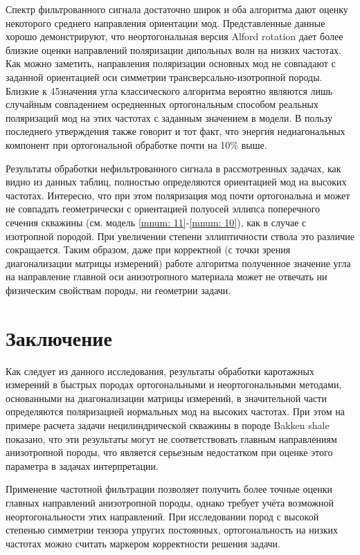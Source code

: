 \documentclass[a4paper,11pt]{article}
\begin{document}
Спектр фильтрованного сигнала достаточно широк и оба алгоритма дают оценку некоторого среднего направления ориентации мод. Представленные данные хорошо демонстрируют, что неортогональная версия Alford rotation дает более близкие оценки направлений поляризации дипольных волн на низких частотах. Как можно заметить, направления поляризации основных мод не совпадают с заданной ориентацией оси симметрии трансверсально-изотропной породы. Близкие к 45\textdegree значения угла классического алгоритма вероятно являются лишь случайным совпадением осредненных ортогональным способом реальных поляризаций мод на этих частотах с заданным значением в модели. В пользу последнего утверждения также говорит и тот факт, что энергия недиагональных компонент при ортогональной обработке почти на 10\% выше. 

Результаты обработки нефильтрованного сигнала в рассмотренных задачах, как видно из данных таблиц, полностью определяются ориентацией мод на высоких частотах. Интересно, что при этом поляризация мод почти ортогональна и может не совпадать геометрически с ориентацией полуосей эллипса поперечного сечения скважины (см. модель \ref{mnum: 11}-\ref{mnum: 10}), как в случае с изотропной породой. При увеличении степени эллиптичности ствола это различие сокращается. Таким образом, даже при корректной (с точки зрения диагонализации матрицы измерений) работе алгоритма полученное значение угла на направление главной оси анизотропного материала может не отвечать ни физическим свойствам породы, ни геометрии задачи. 
\clearpage

\section{Заключение}

Как следует из данного исследования, результаты обработки каротажных измерений в быстрых породах ортогональными и неортогональными методами, основанными на диагонализации матрицы измерений, в значительной части определяются поляризацией нормальных мод на высоких частотах. При этом на примере расчета задачи нецилиндрической скважины в породе Bakken shale показано, что эти результаты могут не соответствовать главным направлениям анизотропной породы, что является серьезным недостатком при оценке этого параметра в задачах интерпретации.

Применение частотной фильтрации позволяет получить более точные оценки главных направлений анизотропной породы, однако требует учёта возможной неортогональности этих направлений. При исследовании пород с высокой степенью симметрии тензора упругих постоянных, ортогональность на низких частотах можно считать маркером корректности решения задачи. 
\end{document}
